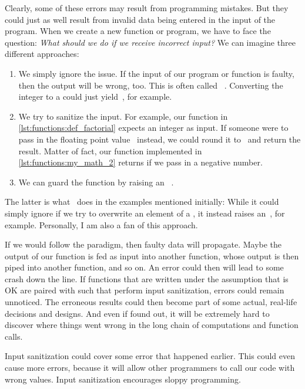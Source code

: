 Clearly, some of these errors may result from programming mistakes.
But they could just as well result from invalid data being entered in the input of the program.%
%
%
When we create a new function or program, we have to face the question:
\emph{What should we do if we receive incorrect input?}
We can imagine three different approaches:%
%
\begin{enumerate}%
%
\item We simply ignore the issue.
If the input of our program or function is faulty, then the output will be wrong, too.
This is often called ~\cite{PKBCBR2005GIGOAELAOMBEUP}.
Converting the integer  to a  could just yield~, for example.%
%
\item We try to sanitize the input.
For example, our  function in \cref{lst:functions:def_factorial} expects an integer as input.
If someone were to pass in the floating point value~ instead, we could round it to~ and return the result.
Matter of fact, our  function implemented in \cref{lst:functions:my_math_2} returns  if we pass in a negative number.%
%
\item We can guard the function by raising an ~\cite{MAGTOC2024EHFAP,SF2013ASROSR,GRRX2001ACSOEHMFBDOOS}.%
%
\end{enumerate}%
%
The latter is what \python\ does in the examples mentioned initially:
While it could simply ignore if we try to overwrite an element of a , it instead raises an~, for example.
Personally, I am also a fan of this approach.

If we would follow the  paradigm, then faulty data will propagate.
Maybe the output of our function is fed as input into another function, whose output is then piped into another function, and so on.
An error could then will lead to some crash down the line.
If functions that are written under the assumption that  is OK are paired with such that perform input sanitization, errors could remain unnoticed.
The erroneous results could then become part of some actual, real-life decisions and designs.
And even if found out, it will be extremely hard to discover where things went wrong in the long chain of computations and function calls.

Input sanitization could cover some error that happened earlier.
This could even cause more errors, because it will allow other programmers to call our code with wrong values.
Input sanitization encourages sloppy programming.

